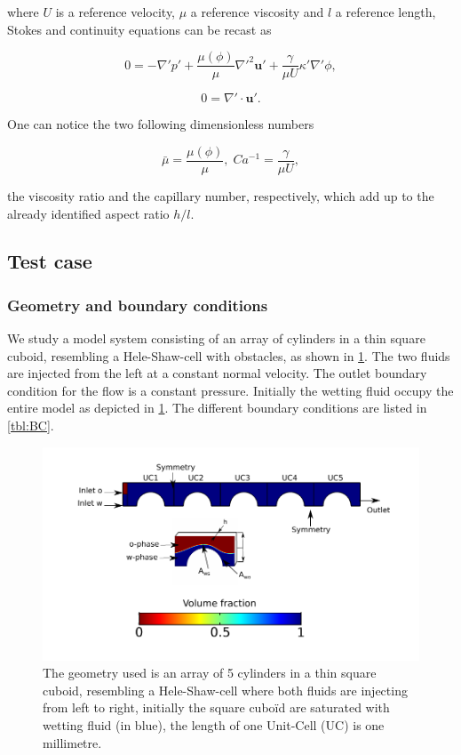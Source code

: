 \documentclass[]{article}
\begin{document}
where \(U\) is a reference velocity, \(\mu\) a reference viscosity and
\(l\) a reference length, Stokes and continuity equations can be recast
as

\[
0=-\nabla'p'+\frac{\mu(\phi)}{\mu}\nabla'^{2}\mathbf{u}'+\frac{\gamma}{\mu U}\kappa'\nabla'\phi,
\]

\[
0=\nabla'\cdot\mathbf{u}'.
\]

One can notice the two following dimensionless numbers

\[
\bar{\mu}=\frac{\mu(\phi)}{\mu},\;Ca^{-1}=\frac{\gamma}{\mu U},
\]

the viscosity ratio and the capillary number, respectively, which add up
to the already identified aspect ratio \(h/l\).

\hypertarget{test-case}{%
\subsection{Test case}\label{test-case}}

\hypertarget{geometry-and-boundary-conditions}{%
\subsubsection{Geometry and boundary
conditions}\label{geometry-and-boundary-conditions}}

We study a model system consisting of an array of cylinders in a thin
square cuboid, resembling a Hele-Shaw-cell with obstacles, as shown in
\cref{fig:model}. The two fluids are injected from the left at a
constant normal velocity. The outlet boundary condition for the flow is
a constant pressure. Initially the wetting fluid occupy the entire model
as depicted in \cref{fig:model}. The different boundary conditions are
listed in \cref{tbl:BC}.

\begin{figure}
\hypertarget{fig:model}{%
\centering
\includegraphics{figures/pdf/model.pdf}
\caption{The geometry used is an array of 5 cylinders in a thin square
cuboid, resembling a Hele-Shaw-cell where both fluids are injecting from
left to right, initially the square cuboïd are saturated with wetting
fluid (in blue), the length of one Unit-Cell (UC) is one
millimetre.}\label{fig:model}
}
\end{figure}
\end{document}
